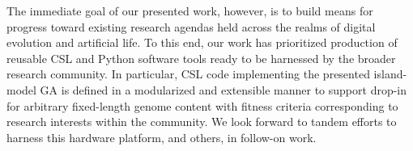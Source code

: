 The immediate goal of our presented work, however, is to build means for progress toward existing research agendas held across the realms of digital evolution and artificial life.
To this end, our work has prioritized production of reusable CSL and Python software tools ready to be harnessed by the broader research community.
In particular, CSL code implementing the presented island-model GA is defined in a modularized and extensible manner to support drop-in for arbitrary fixed-length genome content with fitness criteria corresponding to research interests within the community.
We look forward to tandem efforts to harness this hardware platform, and others, in follow-on work.







